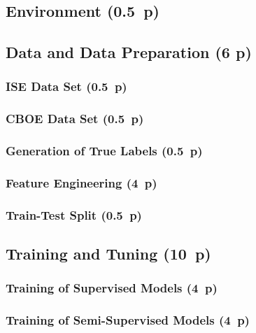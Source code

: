 \subsection{Environment (0.5~p)}\label{environment}

\subsection{Data and Data Preparation (6 p)}\label{data-and-data-preparation}

\subsubsection{ISE Data Set (0.5~p)}\label{ise-data-set}

\subsubsection{CBOE Data Set (0.5~p)}\label{cboe-data-set}

\subsubsection{Generation of True
  Labels (0.5~p)}\label{generation-of-true-labels}

\subsubsection{Feature Engineering (4~p)}\label{feature-engineering}

\subsubsection{Train-Test Split (0.5~p)}\label{train-test-split}

\subsection{Training and Tuning (10~p)}\label{training-and-tuning}

\subsubsection{Training of Supervised
  Models (4~p)}\label{training-of-supervised-models}


\subsubsection{Training of Semi-Supervised
  Models (4~p)}\label{training-of-semi-supervised-models}


